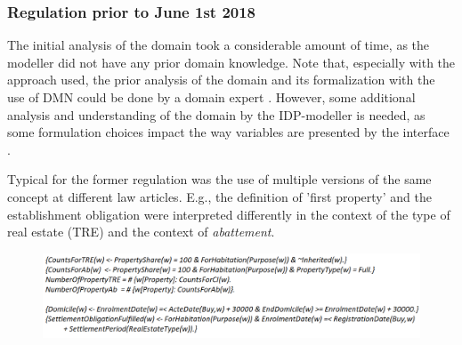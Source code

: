 \subsubsection{Regulation prior to June 1st 2018}
\label{sec:prior2018}
The initial analysis of the domain took a considerable amount of time, as the modeller did not have any prior domain knowledge.
Note that, especially with the approach used, the prior analysis of the domain and its formalization with the use of DMN could be done by a domain expert \cite{iets over DMN en gebruik door business users}.
However, some additional analysis and understanding of the domain by the IDP-modeller is needed, as some formulation choices impact the way variables are presented by the interface \cite{Marjolein}.

Typical for the former regulation was the use of multiple versions of the same concept at different law articles.
E.g., the definition of 'first property' and the establishment obligation were interpreted differently in the context of the type of real estate (TRE) and the context of \textit{abattement}.
\begin{figure}[h]
    \includegraphics[angle=0,width = 1\linewidth]{img/codeOld.png}
	\label{fig:code}
\end{figure}


